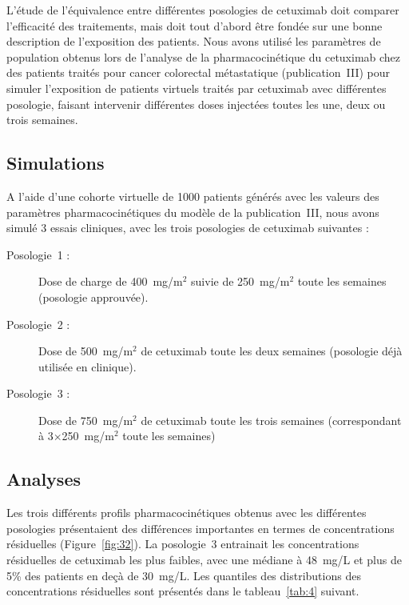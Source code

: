 L'étude de l'équivalence entre différentes posologies de cetuximab doit comparer l'efficacité des traitements, mais doit tout d'abord être fondée sur une bonne description de l'exposition des patients. Nous avons utilisé les paramètres de population obtenus lors de l'analyse de la pharmacocinétique du cetuximab chez des patients traités pour cancer colorectal métastatique (publication~III) pour simuler l'exposition de patients virtuels traités par cetuximab avec différentes posologie, faisant intervenir différentes doses injectées toutes les une, deux ou trois semaines.
\subsection{Simulations}
A l'aide d'une cohorte virtuelle de 1000 patients générés avec les valeurs des paramètres pharmacocinétiques du modèle de la publication~III, nous avons simulé 3 essais cliniques, avec les trois posologies de cetuximab suivantes :
\begin{description}
\item[Posologie~1 :] Dose de charge de 400~mg/m$^2$ suivie de 250~mg/m$^2$ toute les semaines (posologie approuvée).
\item[Posologie~2 :] Dose de 500~mg/m$^2$ de cetuximab toute les deux semaines (posologie déjà utilisée en clinique).
\item[Posologie~3 :] Dose de 750~mg/m$^2$ de cetuximab toute les trois semaines (correspondant à 3$\times$250~mg/m$^2$ toute les semaines)
\end{description}

\subsection{Analyses}
Les trois différents profils pharmacocinétiques obtenus avec les différentes posologies présentaient des différences importantes en termes de concentrations résiduelles (Figure~\ref{fig:32}). La posologie~3 entrainait les concentrations résiduelles de cetuximab les plus faibles, avec une médiane à 48~mg/L et plus de 5\% des patients en deçà de 30~mg/L. Les quantiles des distributions des concentrations résiduelles sont présentés dans le tableau~\ref{tab:4} suivant. 



